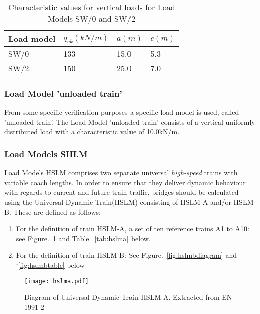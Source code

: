 \begin{table}[h]
	\centering
	\begin{tabular}{llll}
		\hline
		Load model & $ q_{vk} (kN/m) $ & $ a (m) $ & $ c (m) $ \\
		\hline
		SW/0 & 133 & 15.0 & 5.3\\
		SW/2 & 150 & 25.0 & 7.0\\
		\hline
	\end{tabular}
	\caption{Characteristic values for vertical loads for Load Models SW/0 and SW/2}
	\label{tab:sw}
\end{table}

\subsubsection{Load Model 'unloaded train'}
From some specific verification purposes a specific load model is used, called 'unloaded train'. The Load Model 'unloaded train' consists of a vertical uniformly distributed load with a characteristic value of 10.0kN/m.

\subsubsection{Load Models SHLM}
Load Models HSLM comprises two separate universal \textit{high-speed} trains with variable coach lengths. In order to ensure that they deliver dynamic behaviour with regards to current and future train traffic, bridges should be calculated using the Universal Dynamic Train(HSLM) consisting of HSLM-A and/or HSLM-B. These are defined as follows:

\begin{enumerate}[$ \bullet $]
	\item For the definition of train HSLM-A, a set of ten reference trains A1 to A10: see Figure.~\ref{fig:hslma} and Table.~\ref{tab:hslma} below.
	\item For the definition of train HSLM-B: See Figure.~\ref{fig:hslmbdiagram} and `\ref{fig:hslmbtable} below
\end{enumerate}

\begin{figure}[h]
	\centering
	\texttt{[image: hslma.pdf]}
	\caption{Diagram of Universal Dynamic Train HSLM-A. Extracted from EN 1991-2\cite{EC12}}
	\label{fig:hslma}
\end{figure}

